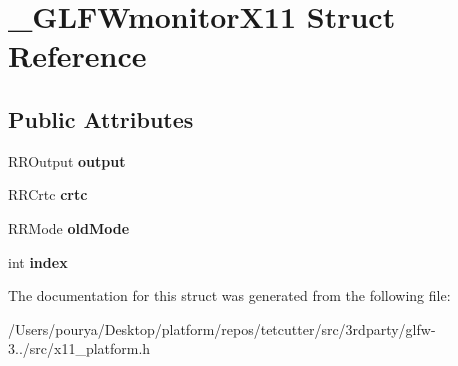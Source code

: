 \hypertarget{struct__GLFWmonitorX11}{}\section{\+\_\+\+G\+L\+F\+Wmonitor\+X11 Struct Reference}
\label{struct__GLFWmonitorX11}
\subsection*{Public Attributes}
\begin{DoxyCompactItemize}
\item 
\hypertarget{struct__GLFWmonitorX11_a4c3af8ee9964e75e02c4085f3beb5159}{}R\+R\+Output {\bfseries output}\label{struct__GLFWmonitorX11_a4c3af8ee9964e75e02c4085f3beb5159}

\item 
\hypertarget{struct__GLFWmonitorX11_ae6a05077744b9df3f06264e4119d94c3}{}R\+R\+Crtc {\bfseries crtc}\label{struct__GLFWmonitorX11_ae6a05077744b9df3f06264e4119d94c3}

\item 
\hypertarget{struct__GLFWmonitorX11_a4c78b460dec9146f01ae0fbce7a180e5}{}R\+R\+Mode {\bfseries old\+Mode}\label{struct__GLFWmonitorX11_a4c78b460dec9146f01ae0fbce7a180e5}

\item 
\hypertarget{struct__GLFWmonitorX11_acd3849d53da4da250dafdbc6052deeaa}{}int {\bfseries index}\label{struct__GLFWmonitorX11_acd3849d53da4da250dafdbc6052deeaa}

\end{DoxyCompactItemize}


The documentation for this struct was generated from the following file\+:\begin{DoxyCompactItemize}
\item 
/\+Users/pourya/\+Desktop/platform/repos/tetcutter/src/3rdparty/glfw-\/3../src/x11\+\_\+platform.\+h\end{DoxyCompactItemize}
